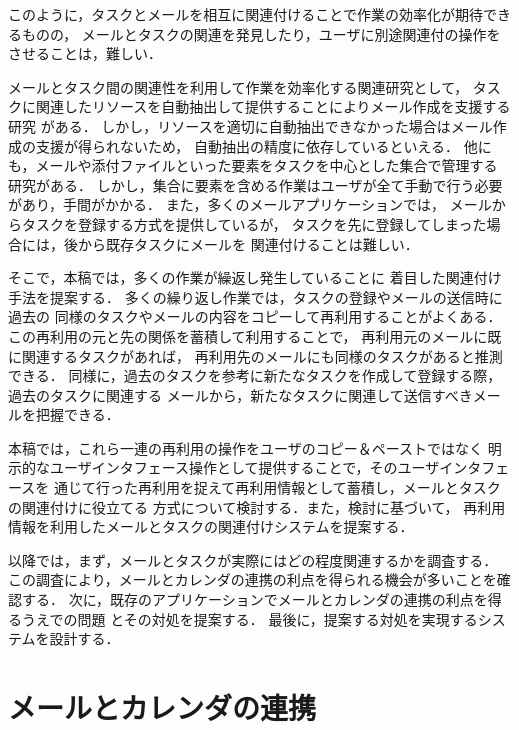 \documentclass[submit,techreq,noauthor,dvipdfmx]{ipsj}
\begin{document}
このように，タスクとメールを相互に関連付けることで作業の効率化が期待できるものの，
メールとタスクの関連を発見したり，ユーザに別途関連付の操作をさせることは，難しい．

メールとタスク間の関連性を利用して作業を効率化する関連研究として，
タスクに関連したリソースを自動抽出して提供することによりメール作成を支援する研究
がある\cite{nagai2009}．
しかし，リソースを適切に自動抽出できなかった場合はメール作成の支援が得られないため，
自動抽出の精度に依存しているといえる．
他にも，メールや添付ファイルといった要素をタスクを中心とした集合で管理する
研究がある\cite{Bellotti2003}．
しかし，集合に要素を含める作業はユーザが全て手動で行う必要があり，手間がかかる．
また，多くのメールアプリケーションでは，
メールからタスクを登録する方式を提供しているが，
タスクを先に登録してしまった場合には，後から既存タスクにメールを
関連付けることは難しい．

そこで，本稿では，多くの作業が繰返し発生していることに
着目した関連付け手法を提案する．
多くの繰り返し作業では，タスクの登録やメールの送信時に過去の
同様のタスクやメールの内容をコピーして再利用することがよくある．
この再利用の元と先の関係を蓄積して利用することで，
再利用元のメールに既に関連するタスクがあれば，
再利用先のメールにも同様のタスクがあると推測できる．
同様に，過去のタスクを参考に新たなタスクを作成して登録する際，過去のタスクに関連する
メールから，新たなタスクに関連して送信すべきメールを把握できる．

本稿では，これら一連の再利用の操作をユーザのコピー＆ペーストではなく
明示的なユーザインタフェース操作として提供することで，そのユーザインタフェースを
通じて行った再利用を捉えて再利用情報として蓄積し，メールとタスクの関連付けに役立てる
方式について検討する．また，検討に基づいて，
再利用情報を利用したメールとタスクの関連付けシステムを提案する．

以降では，まず，メールとタスクが実際にはどの程度関連するかを調査する．
この調査により，メールとカレンダの連携の利点を得られる機会が多いことを確認する．
次に，既存のアプリケーションでメールとカレンダの連携の利点を得るうえでの問題
とその対処を提案する．
最後に，提案する対処を実現するシステムを設計する．


\section{メールとカレンダの連携}\label{chap:mail_task_cooperation}
\end{document}
